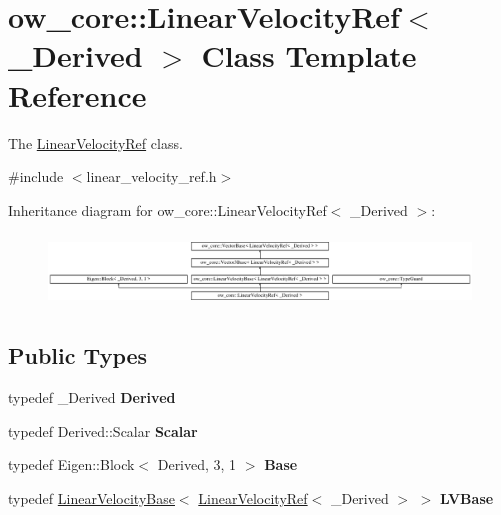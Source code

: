 \hypertarget{classow__core_1_1LinearVelocityRef}{}\section{ow\+\_\+core\+:\+:Linear\+Velocity\+Ref$<$ \+\_\+\+Derived $>$ Class Template Reference}
\label{classow__core_1_1LinearVelocityRef}


The \hyperlink{classow__core_1_1LinearVelocityRef}{Linear\+Velocity\+Ref} class.  




{\ttfamily \#include $<$linear\+\_\+velocity\+\_\+ref.\+h$>$}

Inheritance diagram for ow\+\_\+core\+:\+:Linear\+Velocity\+Ref$<$ \+\_\+\+Derived $>$\+:\begin{figure}[H]
\begin{center}
\leavevmode
\includegraphics[height=1.934370cm]{d8/d79/classow__core_1_1LinearVelocityRef}
\end{center}
\end{figure}
\subsection*{Public Types}
\begin{DoxyCompactItemize}
\item 
typedef \+\_\+\+Derived {\bfseries Derived}\hypertarget{classow__core_1_1LinearVelocityRef_a3ac3012d274d4ac8eb2a40737e0b47a7}{}\label{classow__core_1_1LinearVelocityRef_a3ac3012d274d4ac8eb2a40737e0b47a7}

\item 
typedef Derived\+::\+Scalar {\bfseries Scalar}\hypertarget{classow__core_1_1LinearVelocityRef_a281455dfc570f9d821eb4a49978ea38c}{}\label{classow__core_1_1LinearVelocityRef_a281455dfc570f9d821eb4a49978ea38c}

\item 
typedef Eigen\+::\+Block$<$ Derived, 3, 1 $>$ {\bfseries Base}\hypertarget{classow__core_1_1LinearVelocityRef_ac1a8e68dd0ad57d2f3b226b87afcd4f5}{}\label{classow__core_1_1LinearVelocityRef_ac1a8e68dd0ad57d2f3b226b87afcd4f5}

\item 
typedef \hyperlink{classow__core_1_1LinearVelocityBase}{Linear\+Velocity\+Base}$<$ \hyperlink{classow__core_1_1LinearVelocityRef}{Linear\+Velocity\+Ref}$<$ \+\_\+\+Derived $>$ $>$ {\bfseries L\+V\+Base}\hypertarget{classow__core_1_1LinearVelocityRef_a9cce385d16078271322ec67c3a5e0fdd}{}\label{classow__core_1_1LinearVelocityRef_a9cce385d16078271322ec67c3a5e0fdd}

\end{DoxyCompactItemize}
